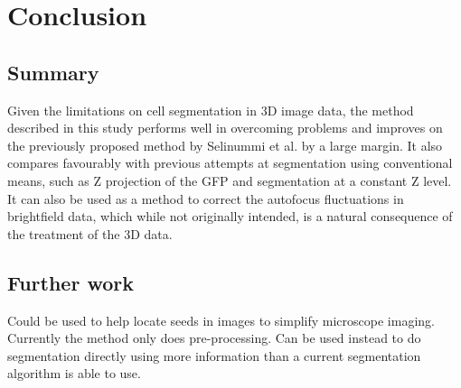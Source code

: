 
\chapter{Conclusion}

\ifpdf
    \graphicspath{{Chapter6/Figs/Raster/}{Chapter6/Figs/PDF/}{Chapter6/Figs/}}
\else
    \graphicspath{{Chapter6/Figs/Vector/}{Chapter6/Figs/}}
\fi

\section{Summary}

Given the limitations on cell segmentation in 3D image data, the method described in this study performs well in overcoming problems and improves on the previously proposed method by Selinummi et al. by a large margin. It also compares favourably with previous attempts at segmentation using conventional means, such as Z projection of the GFP and segmentation at a constant Z level. It can also be used as a method to correct the autofocus fluctuations in brightfield data, which while not originally intended, is a natural consequence of the treatment of the 3D data.



\section{Further work}

Could be used to help locate seeds in images to simplify microscope imaging.
Currently the method only does pre-processing. Can be used instead to do segmentation directly using more information than a current segmentation algorithm is able to use.
